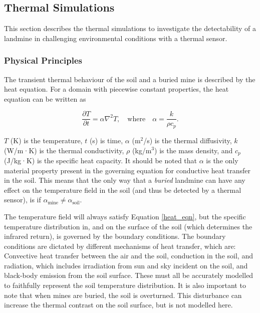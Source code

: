 \subsection{Thermal Simulations} \label{compvis_thermalsims}

    This section describes the thermal simulations to investigate the detectability of a landmine in challenging environmental conditions with a thermal sensor.
    
    \subsubsection{Physical Principles} \label{thermal_principles}
    
         \noindent The transient thermal behaviour of the soil and a buried mine is described by the heat equation. For a domain with piecewise constant properties, the heat equation can be written as
        
        \begin{equation} \label{heat_eqn}
            \frac{\partial T}{\partial t} = \alpha \nabla^2 T, \quad \text{where} \quad \alpha = \frac{k}{\rho c_p}.
        \end{equation}
    
        \noindent \( T \) (K) is the temperature, \( t \) (s) is time, \( \alpha \) (m$^2$/s) is the thermal diffusivity, \( k \) (W/m·K) is the thermal conductivity, \( \rho \) (kg/m$^3$) is the mass density, and \( c_p \) (J/kg·K) is the specific heat capacity. It should be noted that \(\alpha\) is the only material property present in the governing equation for conductive heat transfer in the soil. This means that the only way that a \textit{buried} landmine can have any effect on the temperature field in the soil (and thus be detected by a thermal sensor), is if \(\alpha_{\text{mine}} \neq \alpha_{\text{soil}} \).
    
        The temperature field will always satisfy Equation \ref{heat_eqn}, but the specific temperature distribution in, and on the surface of the soil (which determines the infrared return), is governed by the boundary conditions. The boundary conditions are dictated by different mechanisms of heat transfer, which are: Convective heat transfer between the air and the soil, conduction in the soil, and radiation, which includes irradiation from sun and sky incident on the soil, and black-body emission from the soil surface. These must all be accurately modelled to faithfully represent the soil temperature distribution. It is also important to note that when mines are buried, the soil is overturned. This disturbance can increase the thermal contrast on the soil surface, but is not modelled here.
            
